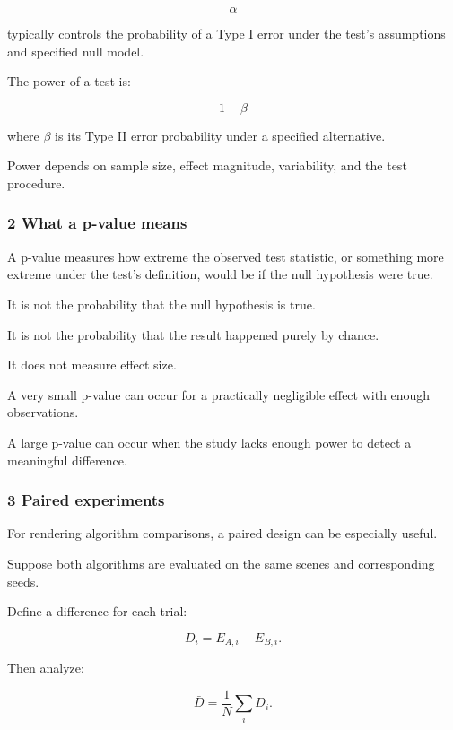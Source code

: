 \[
 \alpha
\]

typically controls the probability of a Type I error under the test's assumptions and specified null model.

The power of a test is:

\[
 \boxed{ 1-\beta }
\]

where \(\beta\) is its Type II error probability under a specified alternative.

Power depends on sample size, effect magnitude, variability, and the test procedure.

\subsubsection{2 What a p-value means}\label{02-foundations-ii-ch030-what-a-p-value-means}

\hypertarget{02-foundations-ii-ch030-what-a-p-value-means}{}

A p-value measures how extreme the observed test statistic, or something more extreme under the test's definition, would be if the null hypothesis were true.

It is not the probability that the null hypothesis is true.

It is not the probability that the result happened purely by chance.

It does not measure effect size.

A very small p-value can occur for a practically negligible effect with enough observations.

A large p-value can occur when the study lacks enough power to detect a meaningful difference.

\subsubsection{3 Paired experiments}\label{02-foundations-ii-ch030-paired-experiments}

\hypertarget{02-foundations-ii-ch030-paired-experiments}{}

For rendering algorithm comparisons, a paired design can be especially useful.

Suppose both algorithms are evaluated on the same scenes and corresponding seeds.

Define a difference for each trial:

\[
 D_i=E_{A,i}-E_{B,i}.
\]

Then analyze:

\[
 \bar D=\frac1N\sum_iD_i.
\]

